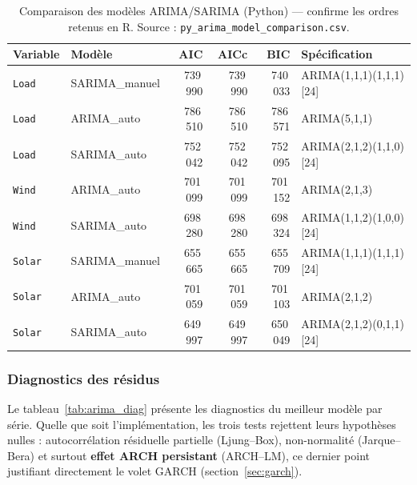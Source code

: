 \begin{table}[H]
\centering
\caption{Comparaison des modèles ARIMA/SARIMA (Python) --- confirme les ordres
retenus en R. Source : \texttt{py\_arima\_model\_comparison.csv}.}
\label{tab:arima_comp_py}
\small
\begin{tabular}{llrrrl}
\toprule
Variable & Modèle & AIC & AICc & BIC & Spécification \\
\midrule
\texttt{Load}  & SARIMA\_manuel & 739\,990 & 739\,990 & 740\,033 & ARIMA(1,1,1)(1,1,1)[24] \\
\texttt{Load}  & ARIMA\_auto    & 786\,510 & 786\,510 & 786\,571 & ARIMA(5,1,1) \\
\texttt{Load}  & SARIMA\_auto   & 752\,042 & 752\,042 & 752\,095 & ARIMA(2,1,2)(1,1,0)[24] \\
\texttt{Wind}  & ARIMA\_auto    & 701\,099 & 701\,099 & 701\,152 & ARIMA(2,1,3) \\
\texttt{Wind}  & SARIMA\_auto   & 698\,280 & 698\,280 & 698\,324 & ARIMA(1,1,2)(1,0,0)[24] \\
\texttt{Solar} & SARIMA\_manuel & 655\,665 & 655\,665 & 655\,709 & ARIMA(1,1,1)(1,1,1)[24] \\
\texttt{Solar} & ARIMA\_auto    & 701\,059 & 701\,059 & 701\,103 & ARIMA(2,1,2) \\
\texttt{Solar} & SARIMA\_auto   & 649\,997 & 649\,997 & 650\,049 & ARIMA(2,1,2)(0,1,1)[24] \\
\bottomrule
\end{tabular}
\end{table}

\subsubsection{Diagnostics des résidus}
Le tableau~\ref{tab:arima_diag} présente les diagnostics du meilleur modèle
par série. Quelle que soit l'implémentation, les trois tests rejettent leurs
hypothèses nulles : autocorrélation résiduelle partielle (Ljung--Box),
non-normalité (Jarque--Bera) et surtout \textbf{effet ARCH persistant}
(ARCH--LM), ce dernier point justifiant directement le volet GARCH
(section~\ref{sec:garch}).

